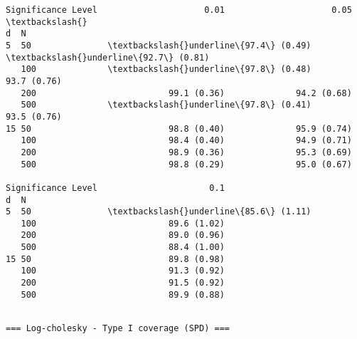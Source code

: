 \documentclass[11pt]{article}
\begin{document}
    
    \begin{Verbatim}[commandchars=\\\{\}]
Significance Level                     0.01                     0.05  \textbackslash{}
d  N                                                                   
5  50               \textbackslash{}underline\{97.4\} (0.49)  \textbackslash{}underline\{92.7\} (0.81)   
   100              \textbackslash{}underline\{97.8\} (0.48)              93.7 (0.76)   
   200                          99.1 (0.36)              94.2 (0.68)   
   500              \textbackslash{}underline\{97.8\} (0.41)              93.5 (0.76)   
15 50                           98.8 (0.40)              95.9 (0.74)   
   100                          98.4 (0.40)              94.9 (0.71)   
   200                          98.9 (0.36)              95.3 (0.69)   
   500                          98.8 (0.29)              95.0 (0.67)   

Significance Level                      0.1  
d  N                                         
5  50               \textbackslash{}underline\{85.6\} (1.11)  
   100                          89.6 (1.02)  
   200                          89.0 (0.96)  
   500                          88.4 (1.00)  
15 50                           89.8 (0.98)  
   100                          91.3 (0.92)  
   200                          91.5 (0.92)  
   500                          89.9 (0.88)  
    \end{Verbatim}

    
    \begin{Verbatim}[commandchars=\\\{\}]

=== Log-cholesky - Type I coverage (SPD) ===
    \end{Verbatim}
\end{document}
